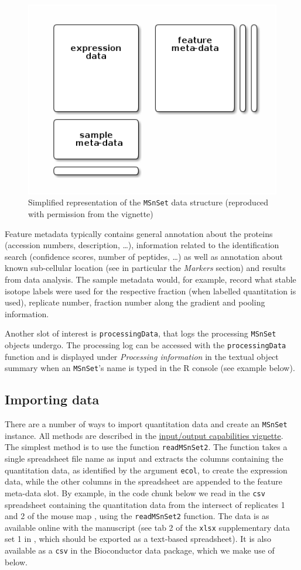 \begin{figure}[!ht]
  \centering
  \includegraphics[width=.5\textwidth]{./Figures/msnset.png}
  \caption{Simplified representation of the \texttt{MSnSet} data
    structure (reproduced with permission from the 
    vignette)}
  \label{fig:msnset}
\end{figure}

Feature metadata typically contains general annotation about the
proteins (accession numbers, description, \ldots), information related
to the identification search (confidence scores, number of peptides,
\ldots) as well as annotation about known sub-cellular location (see in
particular the \textit{Markers} section) and results from data
analysis. The sample metadata would, for example, record what stable
isotope labels were used for the respective fraction (when labelled
quantitation is used), replicate number, fraction number along the
gradient and pooling information.

Another slot of interest is \texttt{processingData}, that logs the
processing \texttt{MSnSet} objects undergo. The processing log can be
accessed with the \texttt{processingData} function and is displayed
under \textit{Processing information} in the textual object summary
when an \texttt{MSnSet}'s name is typed in the R console (see example
below).

\subsection*{Importing data}

There are a number of ways to import quantitation data and create an
\texttt{MSnSet} instance. All methods are described in the
\href{http://bioconductor.org/packages/release/bioc/vignettes/MSnbase/inst/doc/MSnbase-io.pdf}{input/output
  capabilities vignette}. The simplest method is to use the
function \texttt{readMSnSet2}. The function takes a single spreadsheet
file name as input and extracts the columns containing the
quantitation data, as identified by the argument \texttt{ecol}, to
create the expression data, while the other columns in the spreadsheet
are appended to the feature meta-data slot.  By example, in the code
chunk below we read in the \texttt{csv} spreadsheet containing the
quantitation data from the intersect of replicates 1 and 2 of the
mouse map \cite{hyper}, using the \texttt{readMSnSet2} function. The
data is as available online with the manuscript (see tab 2 of the
\texttt{xlsx} supplementary data set 1 in \cite{hyper}, which should
be exported as a text-based spreadsheet). It is also available as a
\texttt{csv} in the Bioconductor  data
package, which we make use of below.

